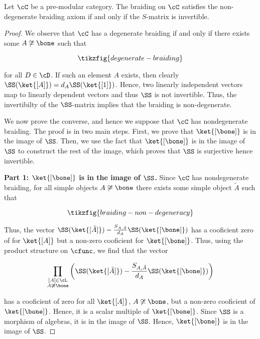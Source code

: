 \begin{thrm} Let $\cC$ be a pre-modular category. The braiding on $\cC$ satisfies the non-degenerate braiding axiom if and only if the $S$-matrix is invertible.
\end{thrm}
\begin{proof} We observe that $\cC$ has a degenerate braiding if and only if there exists some $A\not\cong \bone$ such that

\begin{equation*}
\tikzfig{degenerate-braiding}
\end{equation*}

for all $D\in \cD$. If such an element $A$ exists, then clearly $\SS(\ket{[A]})=d_{A}\SS(\ket{[1]})$. Hence, two linearly independent vectors map to linearly dependent vectors and thus $\SS$ is not invertible. Thus, the invertibilty of the $\SS$-matrix implies that the braiding is non-degenerate.

We now prove the converse, and hence we suppose that $\cC$ has nondegenerate braiding. The proof is in two main steps.  First, we prove that $\ket{[\bone]}$ is in the image of $\SS$. Then, we use the fact that $\ket{[\bone]}$ is in the image of $\SS$ to construct the rest of the image, which proves that $\SS$ is surjective hence invertible.

\textbf{Part 1: $\ket{[\bone]}$ is in the image of $\SS$.} Since $\cC$ has nondegenerate braiding, for all simple objects $A\not\cong \bone$ there exists some simple object $\tilde{A}$ such that

\begin{equation*}
\tikzfig{braiding-non-degeneracy}
\end{equation*}

Thus, the vector $\SS(\ket{[\tilde{A}]})-\frac{S_{A,\tilde{A}}}{d_{A}}\SS(\ket{[\bone]})$ has a cooficient zero of for $\ket{[A]}$ but a non-zero cooficient for $\ket{[\bone]}$. Thus, using the product structure on $\cfunc$, we find that the vector

$$\prod_{\substack{[A]\in \cL \\ A\not\cong \bone}}\left(\SS(\ket{[\tilde{A}]})-\frac{S_{A,\tilde{A}}}{d_{A}}\SS(\ket{[\bone]})\right)$$

has a cooficient of zero for all $\ket{[A]}$, $A\not\cong \bone$, but a non-zero cooficient of $\ket{[\bone]}$. Hence, it is a scalar multiple of $\ket{[\bone]}$. Since $\SS$ is a morphism of algebras, it is in the image of $\SS$. Hence, $\ket{[\bone]}$ is in the image of $\SS$.


\end{proof}
